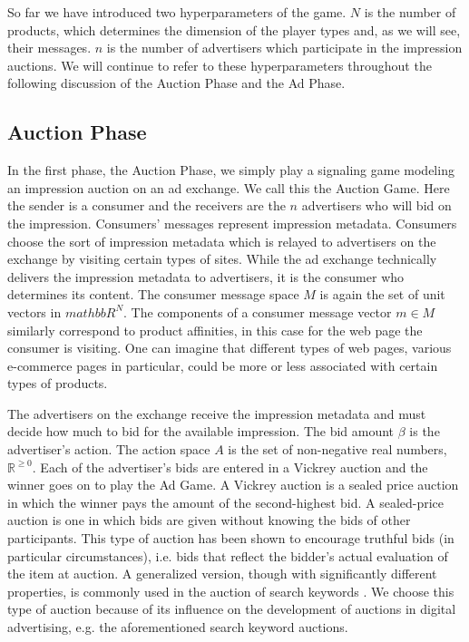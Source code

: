 \documentclass{article}
\begin{document}
So far we have introduced two hyperparameters of the game. $N$ is the number of products, which determines the dimension of the player types and, as we will see, their messages. $n$ is the number of advertisers which participate in the impression auctions. We will continue to refer to these hyperparameters throughout the following discussion of the Auction Phase and the Ad Phase. 

\subsection{Auction Phase}

In the first phase, the Auction Phase, we simply play a signaling game modeling an impression auction on an ad exchange. We call this the Auction Game. Here the sender is a consumer and the receivers are the $n$ advertisers who will bid on the impression. Consumers' messages represent impression metadata. Consumers choose the sort of impression metadata which is relayed to advertisers on the exchange by visiting certain types of sites. While the ad exchange technically delivers the impression metadata to advertisers, it is the consumer who determines its content. The consumer message space $M$ is again the set of unit vectors in $mathbb{R}^N$. The components of a consumer message vector $m \in M$ similarly correspond to product affinities, in this case for the web page the consumer is visiting. One can imagine that different types of web pages, various e-commerce pages in particular, could be more or less associated with certain types of products.

The advertisers on the exchange receive the impression metadata and must decide how much to bid for the available impression. The bid amount $\beta$ is the advertiser's action. The action space $A$ is the set of non-negative real numbers, $\mathbb{R}^{\ge 0}$. Each of the advertiser's bids are entered in a Vickrey auction \cite{vickrey_auctions} and the winner goes on to play the Ad Game. A Vickrey auction is a sealed price auction in which the winner pays the amount of the second-highest bid. A sealed-price auction is one in which bids are given without knowing the bids of other participants. This type of auction has been shown to encourage truthful bids (in particular circumstances), i.e. bids that reflect the bidder's actual evaluation of the item at auction. A generalized version, though with significantly different properties, is commonly used in the auction of search keywords \cite{edelman_gsp}. We choose this type of auction because of its influence on the development of auctions in digital advertising, e.g. the aforementioned search keyword auctions.
\end{document}
